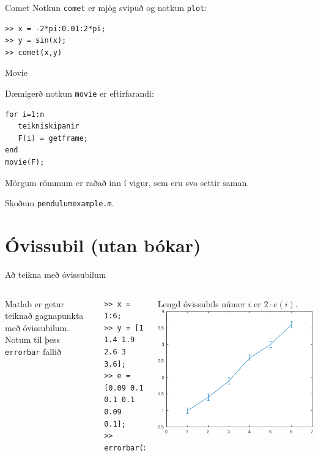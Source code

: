 \documentclass[handout]{beamer}
\begin{document}
\begin{frame}[fragile]{Comet}
Notkun \texttt{comet} er mjög svipuð og notkun \texttt{plot}:
\begin{verbatim}
>> x = -2*pi:0.01:2*pi;
>> y = sin(x);
>> comet(x,y)
\end{verbatim}
\end{frame}

\begin{frame}[fragile]{Movie}

Dæmigerð notkun \texttt{movie} er eftirfarandi:
\begin{verbatim}
for i=1:n
   teikniskipanir
   F(i) = getframe;
end
movie(F);
\end{verbatim}
Mörgum römmum er raðað inn í vigur, sem eru svo settir saman.

Skoðum \texttt{pendulumexample.m}.

\end{frame}

\section{Óvissubil (utan bókar)}

\begin{frame}[fragile]{Að teikna með óvissubilum}
\begin{columns}
Matlab er getur teiknað gagnapunkta með óvissubilum. Notum til þess \texttt{errorbar} fallið
\begin{verbatim}
>> x = 1:6;
>> y = [1 1.4 1.9 2.6 3 3.6];
>> e = [0.09 0.1 0.1 0.1 0.09 0.1];
>> errorbar(x,y,e)
\end{verbatim}
Lengd óvissubils númer $i$ er $2\cdot e(i)$.
\includegraphics[width=\textwidth]{Pics/simple-errorbar}
\end{columns}
\end{frame}
\end{document}
